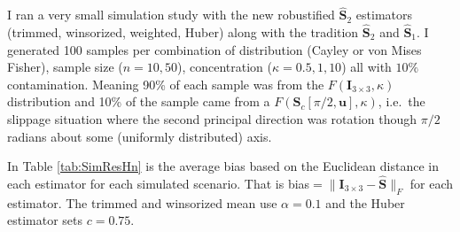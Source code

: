 \documentclass{article}\usepackage[]{graphicx}\usepackage[]{color}
\newcommand{\ProjMean}{{\widehat{\bm S}_{2}}}
\newcommand{\ProjMedian}{{\widehat{\bm S}_{1}}}
\begin{document}
I ran a very small simulation study with the new robustified $\ProjMean$ estimators (trimmed, winsorized, weighted, Huber) along with the tradition $\ProjMean$ and $\ProjMedian$.  I generated 100 samples per combination of distribution (Cayley or von Mises Fisher), sample size ($n=10,50$), concentration ($\kappa=0.5,1,10$) all with $10\%$ contamination.  Meaning 90\% of each sample was from the $F(\bm I_{3\times 3},\kappa)$ distribution and 10\% of the sample came from a $F(\bm S_c[\pi/2,\bm u],\kappa)$, i.e.~the slippage situation where the second principal direction was rotation though $\pi/2$ radians about some (uniformly distributed) axis.

In Table \ref{tab:SimResHn} is the average bias based on the Euclidean distance in each estimator for each simulated scenario.  That is bias$=\|\bm I_{3\times 3}-\widehat{\bm S}\|_F$ for each estimator.  The trimmed and winsorized mean use $\alpha=0.1$ and the Huber estimator sets $c=0.75$.





%   
\end{document}
